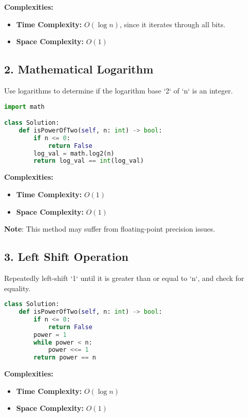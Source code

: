 \textbf{Complexities:}
\begin{itemize}
    \item \textbf{Time Complexity:} \(O(\log n)\), since it iterates through all bits.
    \item \textbf{Space Complexity:} \(O(1)\)
\end{itemize}

\subsection*{2. Mathematical Logarithm}

Use logarithms to determine if the logarithm base `2` of `n` is an integer.

\begin{lstlisting}[language=Python]
import math

class Solution:
    def isPowerOfTwo(self, n: int) -> bool:
        if n <= 0:
            return False
        log_val = math.log2(n)
        return log_val == int(log_val)
\end{lstlisting}

\textbf{Complexities:}
\begin{itemize}
    \item \textbf{Time Complexity:} \(O(1)\)
    \item \textbf{Space Complexity:} \(O(1)\)
\end{itemize}

\textbf{Note}: This method may suffer from floating-point precision issues.

\subsection*{3. Left Shift Operation}

Repeatedly left-shift `1` until it is greater than or equal to `n`, and check for equality.

\begin{lstlisting}[language=Python]
class Solution:
    def isPowerOfTwo(self, n: int) -> bool:
        if n <= 0:
            return False
        power = 1
        while power < n:
            power <<= 1
        return power == n
\end{lstlisting}

\textbf{Complexities:}
\begin{itemize}
    \item \textbf{Time Complexity:} \(O(\log n)\)
    \item \textbf{Space Complexity:} \(O(1)\)
\end{itemize}

